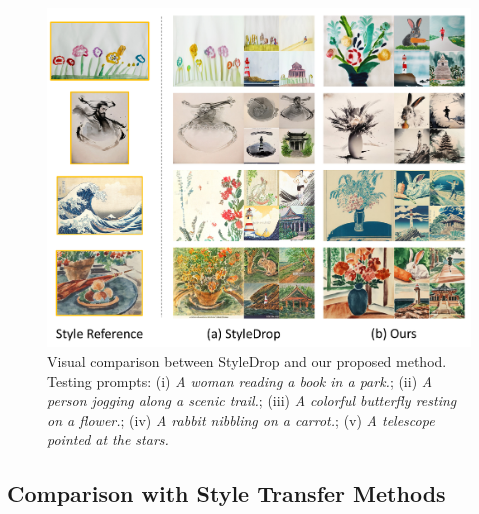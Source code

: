 \begin{figure}[!h]
    \centering
    \vspace{-0.8em}
    \includegraphics[width=0.8\linewidth]{figures/supp/result_comp_styledrop.pdf}
    \vspace{-1.2em}
    \caption{Visual comparison between StyleDrop and our proposed method. Testing prompts: (i) \textit{A woman reading a book in a park.}; (ii) \textit{A person jogging along a scenic trail.}; (iii) \textit{A colorful butterfly resting on a flower.}; (iv) \textit{A rabbit nibbling on a carrot.}; (v) \textit{A telescope pointed at the stars.}} 
    \label{fig:supp_comp_styledrop}
\end{figure}
%
\begin{table}[!h]
\centering
\caption{Quantitative comparison with StyleDrop.}
\vspace{-1em}
\label{tab:supp_comp_styledrop}
\end{table}

\subsection{Comparison with Style Transfer Methods}

